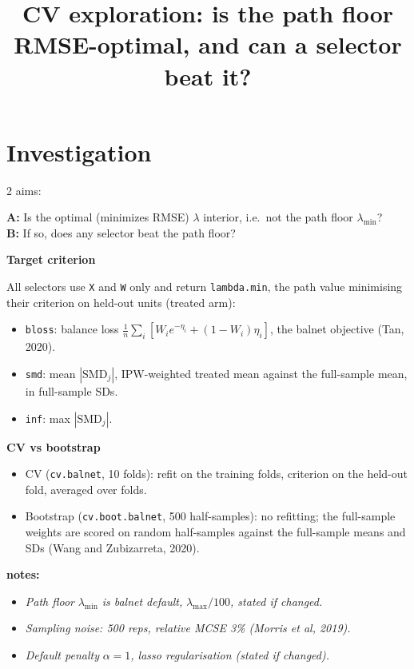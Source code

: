\documentclass[
  letterpaper,
  DIV=11,
  numbers=noendperiod]{scrartcl}
\title{CV exploration: is the path floor RMSE-optimal, and can a
selector beat it?}
\author{}
\date{}
\providecommand{\tightlist}{%
  \setlength{\itemsep}{0pt}\setlength{\parskip}{0pt}}
\begin{document}
\maketitle


\section{Investigation}\label{investigation}

2 aims:

\textbf{A:} Is the optimal (minimizes RMSE) \(\lambda\) interior,
i.e.~not the path floor \(\lambda_{\min}\)?\\
\textbf{B:} If so, does any selector beat the path floor?

\textbf{Target criterion}

All selectors use \texttt{X} and \texttt{W} only and return
\texttt{lambda.min}, the path value minimising their criterion on
held-out units (treated arm):

\begin{itemize}
\tightlist
\item
  \texttt{bloss}: balance loss \(\frac{1}{n}\sum_i [W_i e^{-\eta_i} +
  (1 - W_i)\eta_i]\), the balnet objective (Tan, 2020).
\item
  \texttt{smd}: mean \(|\mathrm{SMD}_j|\), IPW-weighted treated mean
  against the full-sample mean, in full-sample SDs.
\item
  \texttt{inf}: max \(|\mathrm{SMD}_j|\).
\end{itemize}

\textbf{CV vs bootstrap}

\begin{itemize}
\tightlist
\item
  CV (\texttt{cv.balnet}, 10 folds): refit on the training folds,
  criterion on the held-out fold, averaged over folds.
\item
  Bootstrap (\texttt{cv.boot.balnet}, 500 half-samples): no refitting;
  the full-sample weights are scored on random half-samples against the
  full-sample means and SDs (Wang and Zubizarreta, 2020).
\end{itemize}

\textbf{notes:}

\begin{itemize}
\tightlist
\item
  \emph{Path floor} \(\lambda_{\min}\) \emph{is balnet default,}
  \(\lambda_{\max}/100\)\emph{, stated if changed.}
\item
  \emph{Sampling noise: 500 reps, relative MCSE 3\% (Morris et al,
  2019).}
\item
  \emph{Default penalty} \(\alpha = 1\)\emph{, lasso regularisation
  (stated if changed).}
\end{itemize}
\end{document}
